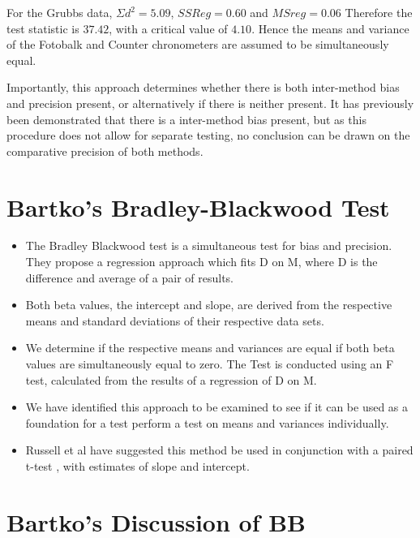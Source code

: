 \documentclass[MAIN.tex]{subfiles}
\begin{document}
	For the Grubbs data, $\Sigma d^{2}=5.09 $, $SSReg = 0.60$ and
	$MSreg=0.06$ Therefore the test statistic is $37.42$, with a
	critical value of $4.10$. Hence the means and variance of the
	Fotobalk and Counter chronometers are assumed to be simultaneously
	equal.
	
	Importantly, this approach determines whether there is both
	inter-method bias and precision present, or alternatively if there
	is neither present. It has previously been demonstrated that there
	is a inter-method bias present, but as this procedure does not
	allow for separate testing, no conclusion can be drawn on the
	comparative precision of both methods.
	
	
	\section{Bartko's Bradley-Blackwood Test}

	\begin{itemize}
		\item The Bradley Blackwood test is a simultaneous test for bias and
		precision. They propose a regression approach which fits D on M,
		where D is the difference and average of a pair of results.
		\item Both beta values, the intercept and slope, are derived from the respective means and
		standard deviations of their respective data sets.
		\item We determine if the respective means and variances are equal if
		both beta values are simultaneously equal to zero. The Test is
		conducted using an F test, calculated from the results of a
		regression of D on M.
		\item We have identified this approach  to be examined to see if it can
		be used as a foundation for a test perform a test on means and
		variances individually.
		\item Russell et al have suggested this method be used in conjunction
		with a paired t-test , with estimates of slope and intercept.
	\end{itemize}
	
	
	
	
\section*{Bartko's Discussion of BB}
\end{document}
